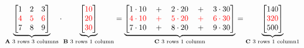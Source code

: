\documentclass[11pt]{article}
\begin{document}
    \begin{equation*}
\underbrace{
\begin{bmatrix}
1 & 2 & 3 \\
\color{red}4 & \color{red}5 & \color{red}6 \\
7 & 8 & 9 \\
\end{bmatrix}
}_{\mathbf{A} \text{ 3 rows} \text{ 3 columns}}
\cdot
\underbrace{
\begin{bmatrix}
\color{red}{10} \\
\color{red}{20} \\
\color{red}{30} \\
\end{bmatrix}
}_{\mathbf{B} \text{  3 rows} \text{  1 column}}
=\underbrace{
\begin{bmatrix}
1 \cdot 10 \quad + \quad 2 \cdot 20 \quad + \quad 3 \cdot 30 \\
\color{red}{4 \cdot 10 \quad + \quad 5 \cdot 20 \quad + \quad 6 \cdot 30} \\
7 \cdot 10 \quad + \quad 8 \cdot 20 \quad + \quad 9 \cdot 30 \\
\end{bmatrix}
}_{\mathbf{C} \text{  3 rows} \text{  1 column}}
=\underbrace{
\begin{bmatrix}
140 \\
\color{red}{320} \\
500 \\
\end{bmatrix}
}_{\mathbf{C} \text{  3 rows} \text{  1 column1}}
\end{equation*}
\end{document}
